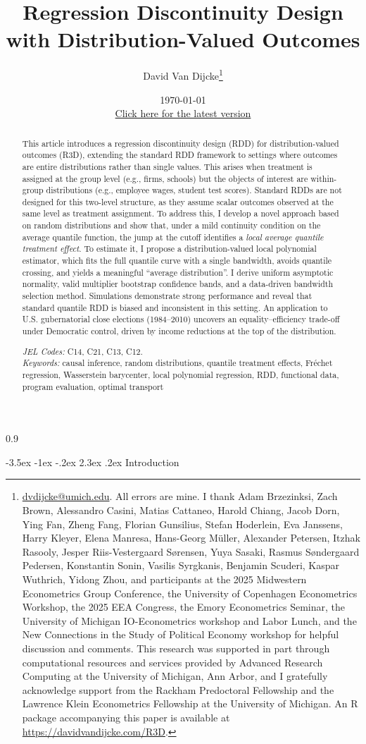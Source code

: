 \documentclass[12pt]{article}
\title{\vspace{-1.5em}Regression Discontinuity Design with Distribution-Valued Outcomes \vspace{-0.5em}}
\author{David Van Dijcke\thanks{\url{dvdijcke@umich.edu}. All errors are mine. I thank Adam Brzezinksi, Zach Brown, Alessandro Casini, Matias Cattaneo, Harold Chiang, Jacob Dorn, Ying Fan, Zheng Fang, Florian Gunsilius, Stefan Hoderlein, Eva Janssens, Harry Kleyer, Elena Manresa, Hans-Georg Müller, Alexander Petersen, Itzhak Rasooly, Jesper Riis-Vestergaard Sørensen, Yuya Sasaki, Rasmus Søndergaard Pedersen, Konstantin Sonin, Vasilis Syrgkanis, Benjamin Scuderi, Kaspar Wuthrich, Yidong Zhou, and participants at the 2025 Midwestern Econometrics Group Conference, the University of Copenhagen Econometrics Workshop, the 2025 EEA Congress, the Emory Econometrics Seminar, the University of Michigan IO-Econometrics workshop and Labor Lunch, and the New Connections in the Study of Political Economy workshop for helpful discussion and comments. This research was supported in part through computational resources and services provided by Advanced Research Computing at the University of Michigan, Ann Arbor, and I gratefully acknowledge support from the Rackham Predoctoral Fellowship and the Lawrence Klein Econometrics Fellowship at the University of Michigan. An R package accompanying this paper is available at \url{https://davidvandijcke.com/R3D}.} 
}
\affil{\small Department of Economics, University of Michigan}
\date{\vspace{-0.5em}\small\today \\ 
\href{https://davidvandijcke.com/files/r3d_latest.pdf}{Click here for the latest version}}
\makeatletter
\renewcommand\section{\@startsection{section}{1}{\z@}%
  {-3.5ex \@plus -1ex \@minus -.2ex}%
  {2.3ex \@plus.2ex}%
  {\bfseries\large\center}} %
\makeatother
\begin{document}
\thispagestyle{empty}
\begin{spacing}{0.9} %
\maketitle

\begin{abstract} 
\noindent 
This article introduces a regression discontinuity design (RDD) for distribution-valued outcomes (R3D), extending the standard RDD framework to settings where outcomes are entire distributions rather than single values. This arises when treatment is assigned at the group level (e.g., firms, schools) but the objects of interest are within-group distributions (e.g., employee wages, student test scores). Standard RDDs are not designed for this two-level structure, as they assume scalar outcomes observed at the same level as treatment assignment. To address this, I develop a novel approach based on random distributions and show that, under a mild continuity condition on the average quantile function, the jump at the cutoff identifies a \emph{local average quantile treatment effect}. To estimate it, I propose a distribution-valued local polynomial estimator, which fits the full quantile curve with a single bandwidth, avoids quantile crossing, and yields a meaningful ``average distribution''. I derive uniform asymptotic normality, valid multiplier bootstrap confidence bands, and a data-driven bandwidth selection method. Simulations demonstrate strong performance and reveal that standard quantile RDD is biased and inconsistent in this setting. An application to U.S. gubernatorial close elections (1984--2010) uncovers an equality--efficiency trade-off under Democratic control, driven by income reductions at the top of the distribution.
 \\
\vspace{0.5em}

\noindent \emph{JEL Codes:} C14, C21, C13, C12. \\ 
\emph{Keywords:} causal inference, random distributions, quantile treatment effects, Fr\'echet regression, Wasserstein barycenter, local polynomial regression, RDD, functional data, program evaluation, optimal transport
\end{abstract}
\end{spacing}
\clearpage

\onehalfspacing

\section{Introduction}
\end{document}

